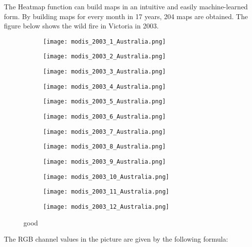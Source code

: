 \documentclass[../main]{subfiles}
\begin{document}
The Heatmap function can build maps in an intuitive and easily
machine-learned form. By building maps for every month in 17 years, 204
maps are obtained. The figure below shows the wild fire in Victoria in
2003.

\begin{figure}[h!]
  \centering
\begin{subfigure}[b]{0.25\linewidth}
\texttt{[image: modis\_2003\_1\_Australia.png]}
\end{subfigure}
\begin{subfigure}[b]{0.25\linewidth}
\texttt{[image: modis\_2003\_2\_Australia.png]}
\end{subfigure}
\begin{subfigure}[b]{0.25\linewidth}
\texttt{[image: modis\_2003\_3\_Australia.png]}
\end{subfigure}
\begin{subfigure}[b]{0.25\linewidth}
\texttt{[image: modis\_2003\_4\_Australia.png]}
\end{subfigure}
\begin{subfigure}[b]{0.25\linewidth}
\texttt{[image: modis\_2003\_5\_Australia.png]}
\end{subfigure}
\begin{subfigure}[b]{0.25\linewidth}
\texttt{[image: modis\_2003\_6\_Australia.png]}
\end{subfigure}
\begin{subfigure}[b]{0.25\linewidth}
  \texttt{[image: modis\_2003\_7\_Australia.png]}
  \end{subfigure}
  \begin{subfigure}[b]{0.25\linewidth}
  \texttt{[image: modis\_2003\_8\_Australia.png]}
  \end{subfigure}
  \begin{subfigure}[b]{0.25\linewidth}
  \texttt{[image: modis\_2003\_9\_Australia.png]}
  \end{subfigure}
  \begin{subfigure}[b]{0.25\linewidth}
  \texttt{[image: modis\_2003\_10\_Australia.png]}
  \end{subfigure}
  \begin{subfigure}[b]{0.25\linewidth}
  \texttt{[image: modis\_2003\_11\_Australia.png]}
  \end{subfigure}
  \begin{subfigure}[b]{0.25\linewidth}
  \texttt{[image: modis\_2003\_12\_Australia.png]}
  \end{subfigure}
\caption{good}
  \label{fig:1-12}
\end{figure}
The RGB channel values in the picture are given by the following
formula:
\end{document}
